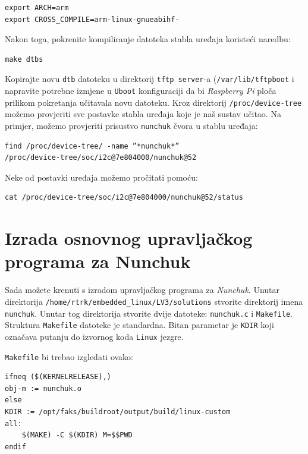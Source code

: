 \documentclass[11pt]{article}
\begin{document}
\begin{lstlisting}
export ARCH=arm
export CROSS_COMPILE=arm-linux-gnueabihf-
\end{lstlisting}
Nakon toga, pokrenite kompiliranje datoteka stabla uređaja koristeći naredbu:
\begin{lstlisting}
make dtbs
\end{lstlisting}
Kopirajte novu \texttt{dtb} datoteku u direktorij \texttt{tftp server}-a
(\texttt{/var/lib/tftpboot} i napravite potrebne izmjene u \texttt{Uboot}
konfiguraciji da bi \textit{Raspberry Pi} ploča prilikom pokretanja učitavala
novu datoteku.
\newline
\newline
Kroz direktorij \texttt{/proc/device-tree} možemo provjeriti sve postavke
stabla uređaja koje je naš sustav učitao.
\newline
\newline
Na primjer, možemo provjeriti prisustvo \texttt{nunchuk} čvora u stablu uređaja:
\begin{lstlisting}
find /proc/device-tree/ -name ”*nunchuk*”
/proc/device-tree/soc/i2c@7e804000/nunchuk@52
\end{lstlisting}
Neke od postavki uređaja možemo pročitati pomoću:
\begin{lstlisting}
cat /proc/device-tree/soc/i2c@7e804000/nunchuk@52/status
\end{lstlisting}

\section{Izrada osnovnog upravljačkog programa za Nunchuk}
Sada možete krenuti s izradom upravljačkog programa za \textit{Nunchuk}.
Unutar direktorija \texttt{/home/rtrk/embedded\_linux/LV3/solutions} stvorite
direktorij imena \texttt{nunchuk}. Unutar tog direktorija stvorite dvije
datoteke: \texttt{nunchuk.c} i \texttt{Makefile}.
\newline
\newline
Struktura \texttt{Makefile} datoteke je standardna. Bitan parametar je
\texttt{KDIR} koji označava putanju do izvornog koda \texttt{Linux} jezgre.

\texttt{Makefile} bi trebao izgledati ovako:
\begin{lstlisting}
ifneq ($(KERNELRELEASE),)
obj-m := nunchuk.o
else
KDIR := /opt/faks/buildroot/output/build/linux-custom
all:
	$(MAKE) -C $(KDIR) M=$$PWD
endif
\end{lstlisting}
\end{document}
